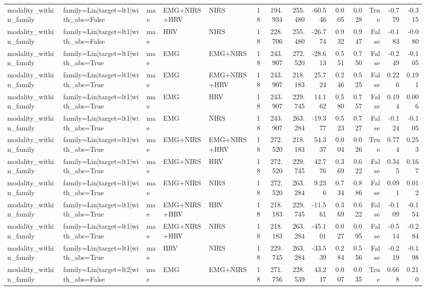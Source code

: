 \begin{table}
\begin{tabular}{lllllrrrrrrrrr}
modality_within_family & family=Lin|target=lt1|with_abs=False & mae & EMG+NIRS+HRV & NIRS & 18 & 194.934 & 255.480 & -60.546 & 0.005 & 0.028 & True & -0.779 & -0.315 \\
modality_within_family & family=Lin|target=lt1|with_abs=False & mae & HRV & NIRS & 18 & 228.706 & 255.480 & -26.774 & 0.932 & 0.947 & False & -0.183 & -0.080 \\
modality_within_family & family=Lin|target=lt1|with_abs=True & mae & EMG & EMG+NIRS & 18 & 243.907 & 272.520 & -28.613 & 0.551 & 0.750 & False & -0.249 & -0.105 \\
modality_within_family & family=Lin|target=lt1|with_abs=True & mae & EMG & EMG+NIRS+HRV & 18 & 243.907 & 218.183 & 25.724 & 0.246 & 0.525 & False & 0.226 & 0.191 \\
modality_within_family & family=Lin|target=lt1|with_abs=True & mae & EMG & HRV & 18 & 243.907 & 229.745 & 14.162 & 0.580 & 0.757 & False & 0.194 & 0.006 \\
modality_within_family & family=Lin|target=lt1|with_abs=True & mae & EMG & NIRS & 18 & 243.907 & 263.284 & -19.377 & 0.523 & 0.727 & False & -0.124 & -0.105 \\
modality_within_family & family=Lin|target=lt1|with_abs=True & mae & EMG+NIRS & EMG+NIRS+HRV & 18 & 272.520 & 218.183 & 54.337 & 0.004 & 0.026 & True & 0.774 & 0.253 \\
modality_within_family & family=Lin|target=lt1|with_abs=True & mae & EMG+NIRS & HRV & 18 & 272.520 & 229.745 & 42.776 & 0.369 & 0.622 & False & 0.345 & 0.167 \\
modality_within_family & family=Lin|target=lt1|with_abs=True & mae & EMG+NIRS & NIRS & 18 & 272.520 & 263.284 & 9.236 & 0.734 & 0.886 & False & 0.091 & 0.012 \\
modality_within_family & family=Lin|target=lt1|with_abs=True & mae & EMG+NIRS+HRV & HRV & 18 & 218.183 & 229.745 & -11.561 & 0.369 & 0.622 & False & -0.109 & -0.154 \\
modality_within_family & family=Lin|target=lt1|with_abs=True & mae & EMG+NIRS+HRV & NIRS & 18 & 218.183 & 263.284 & -45.101 & 0.027 & 0.095 & False & -0.514 & -0.284 \\
modality_within_family & family=Lin|target=lt1|with_abs=True & mae & HRV & NIRS & 18 & 229.745 & 263.284 & -33.539 & 0.284 & 0.556 & False & -0.219 & -0.198 \\
modality_within_family & family=Lin|target=lt2|with_abs=False & mae & EMG & EMG+NIRS & 18 & 271.756 & 228.539 & 43.217 & 0.007 & 0.035 & True & 0.668 & 0.210 \\

\end{tabular}
\end{table}
